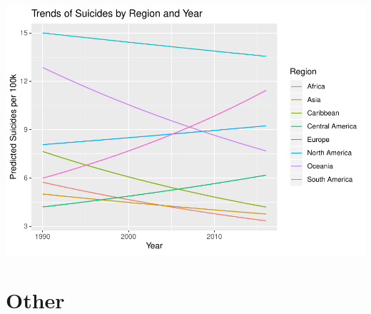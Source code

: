 \documentclass[11pt,]{article}
\begin{document}
\includegraphics{An-Analysis-of-Suicide-Data_files/figure-latex/unnamed-chunk-14-1.pdf}

\hypertarget{other}{%
\section{Other}\label{other}}
\end{document}
